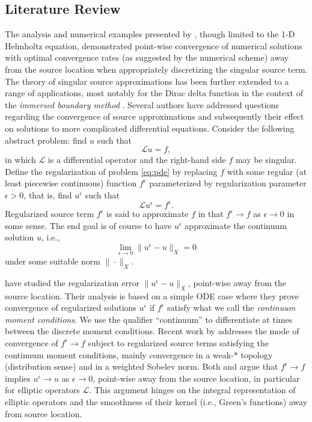 \subsection{Literature Review} 

The analysis and numerical examples presented by \cite{Walden:1999}, though limited to the 1-D Helmholtz equation, demonstrated point-wise convergence of numerical solutions with optimal convergence rates (as suggested by the numerical scheme) away from the source location when appropriately discretizing the singular source term.
The theory of singular source approximations has been further extended to a range of applications, most notably for the Dirac delta function in the context of the {\em immersed boundary method} \citep{Pes:02}. 
Several authors have addressed questions regarding the convergence of source approximations and subsequently their effect on solutions to more complicated differential equations.
Consider the following abstract problem: find $u$ such that
\begin{equation}\label{eq:pde}
	\mathcal L u = f,
\end{equation}
in which $\mathcal L$ is a differential operator and the right-hand
side $f$ may be singular.
Define the regularization of problem \ref{eq:pde} by replacing $f$ with some regular (at least piecewise continuous) function $f^\epsilon$ parameterized by regularization parameter $\epsilon>0$, that is, find $u^\epsilon$ such that
\begin{equation}\label{eq:pde_reg}
	\mathcal L u^\epsilon = f^{\epsilon}.
\end{equation}
Regularized source term $f^\epsilon$ is said to approximate $f$ in that $f^\epsilon \to f$ as $\epsilon \to 0$ in some sense.
The end goal is of course to have $u^\epsilon$ approximate the continuum solution $u$, i.e.,
\[
	\lim_{\epsilon\to 0}\|u^\epsilon-u\|_X = 0
\]
under some suitable norm $\|\cdot\|_X$.

\cite{TorEng:03} have studied the regularization error $\|u^\epsilon - u\|_X$, point-wise away from the source location.
Their analysis is based on a simple ODE case where they prove convergence of regularized solutions $u^\epsilon$ if $f^{\epsilon}$ satisfy what we call the {\em continuum moment conditions}. 
We use the qualifier ``continuum'' to differentiate at times between the discrete moment conditions.
Recent work by \cite{hoss:16} addresses the mode of convergence of $f^\epsilon\to f$ subject to regularized source terms satisfying the continuum moment conditions, mainly convergence in a weak-$*$ topology (distribution sense) and in a weighted Sobelev norm.
Both \cite{TorEng:03} and \cite{hoss:16} argue that $f^{\epsilon}\to f$ implies $u^\epsilon\to u$ as $\epsilon \to 0$, point-wise away from the source location, in particular for elliptic operators $\mathcal L$. 
This argument hinges on the integral representation of elliptic operators and the smoothness of their kernel (i.e., Green's functions) away from source location.

